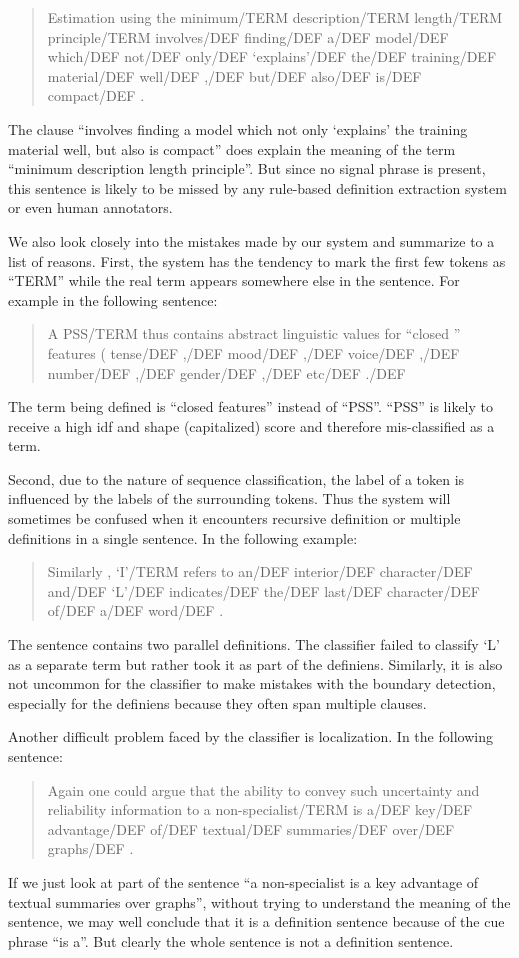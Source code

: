 \documentclass[hyp]{socreport}
\begin{document}
\begin{quotation}
\noindent
Estimation using the minimum/TERM description/TERM length/TERM principle/TERM involves/DEF finding/DEF a/DEF model/DEF which/DEF not/DEF only/DEF `explains'/DEF the/DEF training/DEF material/DEF well/DEF ,/DEF but/DEF also/DEF is/DEF compact/DEF . 
\end{quotation}
\noindent
The clause ``involves finding a model which not only `explains' the training material well, but also is compact'' does explain the meaning of the term ``minimum description length principle''. But since no signal phrase is present, this sentence is likely to be missed by any rule-based definition extraction system or even human annotators. 

We also look closely into the mistakes made by our system and summarize to a list of reasons. First, the system has the tendency to mark the first few tokens as ``TERM'' while the real term appears somewhere else in the sentence. For example in the following sentence:

\begin{quotation}
\noindent
A PSS/TERM thus contains abstract linguistic values for ``closed '' features ( tense/DEF ,/DEF mood/DEF ,/DEF voice/DEF ,/DEF number/DEF ,/DEF gender/DEF ,/DEF etc/DEF ./DEF 
\end{quotation}
\noindent
The term being defined is ``closed features'' instead of ``PSS''. ``PSS'' is likely to receive a high idf and shape (capitalized) score and therefore mis-classified as a term. 

Second, due to the nature of sequence classification, the label of a token is influenced by the labels of the surrounding tokens. Thus the system will sometimes be confused when it encounters recursive definition or multiple definitions in a single sentence. In the following example:

\begin{quotation}
\noindent
Similarly , `I'/TERM refers to an/DEF interior/DEF character/DEF and/DEF `L'/DEF indicates/DEF the/DEF last/DEF character/DEF of/DEF a/DEF word/DEF .   
\end{quotation}
\noindent
The sentence contains two parallel definitions. The classifier failed to classify `L' as a separate term but rather took it as part of the definiens. Similarly, it is also not uncommon for the classifier to make mistakes with the boundary detection, especially for the definiens because they often span multiple clauses. 

Another difficult problem faced by the classifier is localization. In the following sentence:
\begin{quotation}
\noindent
Again one could argue that the ability to convey such uncertainty and reliability information to a non-specialist/TERM is a/DEF key/DEF advantage/DEF of/DEF textual/DEF summaries/DEF over/DEF graphs/DEF .
\end{quotation}
\noindent
If we just look at part of the sentence ``a non-specialist is a key advantage of textual summaries over graphs'', without trying to understand the meaning of the sentence, we may well conclude that it is a definition sentence because of the cue phrase ``is a''. But clearly the whole sentence is not a definition sentence.    
\end{document}
